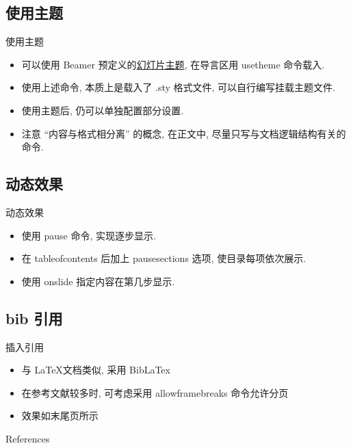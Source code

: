 \documentclass[aspectratio=169]{beamer}  %
\begin{document}
\subsection{使用主题}
\begin{frame}{使用主题}
	\begin{itemize}
		\item 可以使用 Beamer 预定义的\href{http://latex.artikel-namsu.de/english/themes/uebersicht_beamer.html}{幻灯片主题}, 在导言区用 usetheme 命令载入.
		\item 使用上述命令, 本质上是载入了 .sty 格式文件, 可以自行编写挂载主题文件.
		\item 使用主题后, 仍可以单独配置部分设置.
		\item 注意 ``内容与格式相分离'' 的概念, 在正文中, 尽量只写与文档逻辑结构有关的命令.
	\end{itemize}
\end{frame}
\subsection{动态效果}
\begin{frame}{动态效果}
	\begin{itemize}
		\item 使用 pause 命令, 实现逐步显示.
		\pause
		\item 在 tableofcontents 后加上 pausesections 选项, 使目录每项依次展示.
		\pause
		\item 使用 onslide 指定内容在第几步显示.
	\end{itemize}
\end{frame}

\subsection{bib 引用}
\begin{frame}{插入引用}
    \begin{itemize}
        \item 与 \LaTeX 文档类似, 采用 BibLaTex\cite{ni2019performance} \pause
        \item 在参考文献较多时, 可考虑采用 allowframebreaks 命令允许分页\cite{ni2021multi,zhang2020model} \pause
        \item 效果如末尾页所示
    \end{itemize}
\end{frame}

\begin{frame}{References} 
    
\end{frame}
\end{document}
